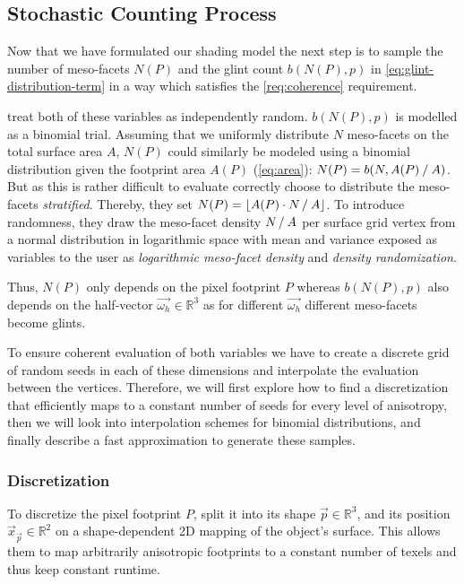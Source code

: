 \subsection{Stochastic Counting Process}
\label{sec:stochastic-counting-process}

Now that we have formulated our shading model the next step is to sample the number of meso-facets $N(P)$ and the glint count $b(N(P),p)$ in \cref{eq:glint-distribution-term} in a way which satisfies the \ref{req:coherence} requirement.


\textcite{deliot2023} treat both of these variables as independently random.
%
$b(N(P),p)$ is modelled as a binomial trial.
%
Assuming that we uniformly distribute $N$ meso-facets on the total surface area $A$, $N(P)$ could similarly be modeled using a binomial distribution given the footprint area $A(P)$ (\cref{eq:area}): $N(P)=b(N,A(P)\mathbin{/}A)$.
%
But as this is rather difficult to evaluate correctly \textcite{deliot2023} choose to distribute the meso-facets \emph{stratified}.
%
Thereby, they set $N(P)=\lfloor A(P) \cdot N\mathbin{/}A \rfloor$.
%
To introduce randomness, they draw the meso-facet density $N\mathbin{/}A$ per surface grid vertex from a normal distribution in logarithmic space with mean and variance exposed as variables to the user as \emph{logarithmic meso-facet density} and \emph{density randomization}.


Thus, $N(P)$ only depends on the pixel footprint $P$ whereas $b(N(P),p)$ also depends on the half-vector $\vec{\omega_h} \in \mathbb{R}^3$ as for different $\vec{\omega_h}$ different meso-facets become glints.


To ensure coherent evaluation of both variables we have to create a discrete grid of random seeds in each of these dimensions and interpolate the evaluation between the vertices.
%
Therefore, we will first explore how to find a discretization that efficiently maps to a constant number of seeds for every level of anisotropy, then we will look into interpolation schemes for binomial distributions, and finally describe a fast approximation to generate these samples.


\subsubsection{Discretization}
\label{sec:discretization}

To discretize the pixel footprint $P$, \textcite{deliot2023} split it into its shape $\vec{p} \in \mathbb{R}^3$, and its position $\vec{x}_{\vec{p}} \in \mathbb{R}^2$ on a shape-dependent 2D mapping of the object's surface.
%
This allows them to map arbitrarily anisotropic footprints to a constant number of texels and thus keep constant runtime.


